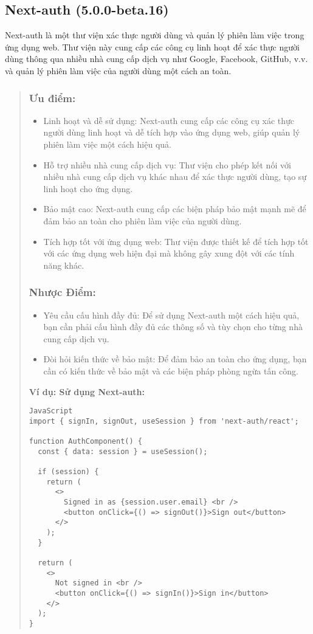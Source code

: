 \subsection{Next-auth (5.0.0-beta.16)}

Next-auth là một thư viện xác thực người dùng và quản lý phiên làm việc trong ứng dụng web. Thư viện này cung cấp các công cụ linh hoạt để xác thực người dùng thông qua nhiều nhà cung cấp dịch vụ như Google, Facebook, GitHub, v.v. và quản lý phiên làm việc của người dùng một cách an toàn.

\begin{quote}
\subsubsection{Ưu điểm:}
\begin{itemize}
  \item Linh hoạt và dễ sử dụng: Next-auth cung cấp các công cụ xác thực người dùng linh hoạt và dễ tích hợp vào ứng dụng web, giúp quản lý phiên làm việc một cách hiệu quả.
  \item Hỗ trợ nhiều nhà cung cấp dịch vụ: Thư viện cho phép kết nối với nhiều nhà cung cấp dịch vụ khác nhau để xác thực người dùng, tạo sự linh hoạt cho ứng dụng.
  \item Bảo mật cao: Next-auth cung cấp các biện pháp bảo mật mạnh mẽ để đảm bảo an toàn cho phiên làm việc của người dùng.
  \item Tích hợp tốt với ứng dụng web: Thư viện được thiết kế để tích hợp tốt với các ứng dụng web hiện đại mà không gây xung đột với các tính năng khác.
\end{itemize}

\subsubsection{Nhược Điểm:}
\begin{itemize}
  \item Yêu cầu cấu hình đầy đủ: Để sử dụng Next-auth một cách hiệu quả, bạn cần phải cấu hình đầy đủ các thông số và tùy chọn cho từng nhà cung cấp dịch vụ.
  \item Đòi hỏi kiến thức về bảo mật: Để đảm bảo an toàn cho ứng dụng, bạn cần có kiến thức về bảo mật và các biện pháp phòng ngừa tấn công.
\end{itemize}

\textbf{Ví dụ: Sử dụng Next-auth:}
\begin{lstlisting}
JavaScript
import { signIn, signOut, useSession } from 'next-auth/react';

function AuthComponent() {
  const { data: session } = useSession();

  if (session) {
    return (
      <>
        Signed in as {session.user.email} <br />
        <button onClick={() => signOut()}>Sign out</button>
      </>
    );
  }

  return (
    <>
      Not signed in <br />
      <button onClick={() => signIn()}>Sign in</button>
    </>
  );
}
\end{lstlisting}
\end{quote}



